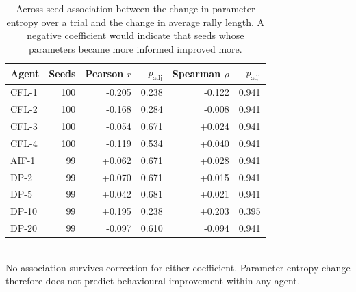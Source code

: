 \begin{table}[ht]
\centering
\small
\caption{Across-seed association between the change in parameter entropy over a trial and the change in average rally length. A negative coefficient would indicate that seeds whose parameters became more informed improved more.}
\label{tab:ntepredict}
\begin{tabular}{lrrrrr}
\toprule
Agent & Seeds & Pearson $r$ & $p_{\mathrm{adj}}$ & Spearman $\rho$ & $p_{\mathrm{adj}}$ \\
\midrule
CFL-1 & 100 & -0.205 & 0.238 & -0.122 & 0.941 \\
CFL-2 & 100 & -0.168 & 0.284 & -0.008 & 0.941 \\
CFL-3 & 100 & -0.054 & 0.671 & +0.024 & 0.941 \\
CFL-4 & 100 & -0.119 & 0.534 & +0.040 & 0.941 \\
AIF-1 & 99 & +0.062 & 0.671 & +0.028 & 0.941 \\
DP-2 & 99 & +0.070 & 0.671 & +0.015 & 0.941 \\
DP-5 & 99 & +0.042 & 0.681 & +0.021 & 0.941 \\
DP-10 & 99 & +0.195 & 0.238 & +0.203 & 0.395 \\
DP-20 & 99 & -0.097 & 0.610 & -0.094 & 0.941 \\
\bottomrule
\end{tabular}
\\[4pt]\footnotesize{No association survives correction for either coefficient. Parameter entropy change therefore does not predict behavioural improvement within any agent.}
\end{table}
